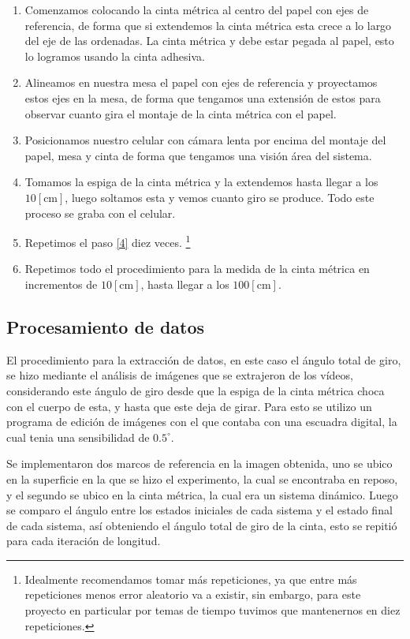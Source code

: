 \documentclass[11pt]{article}
\begin{document}
\begin{enumerate}
    \item Comenzamos colocando la cinta métrica al centro del papel con ejes de referencia, de forma que si extendemos la cinta métrica esta crece a lo largo del eje de las ordenadas. La cinta métrica y debe estar pegada al papel, esto lo logramos usando la cinta adhesiva.
    \item Alineamos en nuestra mesa el papel con ejes de referencia y proyectamos estos ejes en la mesa, de forma que tengamos una extensión de estos para observar cuanto gira el montaje de la cinta métrica con el papel. 
    \item Posicionamos nuestro celular con cámara lenta por encima del montaje del papel, mesa y cinta de forma que tengamos una visión área del sistema.
    \item Tomamos la espiga de la cinta métrica y la extendemos hasta llegar a los $10[\text{cm}]$, luego soltamos esta y vemos cuanto giro se produce. Todo este proceso se graba con el celular. \label{4} 
    \item Repetimos el paso \ref{4} diez veces. \footnote{Idealmente recomendamos tomar más repeticiones, ya que entre más repeticiones menos error aleatorio va a existir, sin embargo, para este proyecto en particular por temas de tiempo tuvimos que mantenernos en diez repeticiones.}
    \item Repetimos todo el procedimiento para la medida de la cinta métrica en incrementos de $10[\text{cm}]$, hasta llegar a los $100[\text{cm}]$.
\end{enumerate}

\subsection{Procesamiento de datos}
El procedimiento para la extracción de datos, en este caso el ángulo total de giro, se hizo mediante el análisis de imágenes que se extrajeron de los vídeos, considerando este ángulo de giro desde que la espiga de la cinta métrica choca con el cuerpo de esta, y hasta que este deja de girar. Para esto se utilizo un programa de edición de imágenes con el que contaba con una escuadra digital, la cual tenia una sensibilidad de $0.5^{\circ}$. 

\medskip
Se implementaron dos marcos de referencia en la imagen obtenida, uno se ubico en la superficie en la que se hizo el experimento, la cual se encontraba en reposo, y el segundo se ubico en la cinta métrica, la cual era un sistema dinámico. Luego se comparo el ángulo entre los estados iniciales de cada sistema y el estado final de cada sistema, así obteniendo el ángulo total de giro de la cinta, esto se repitió para cada iteración de longitud.
\end{document}
